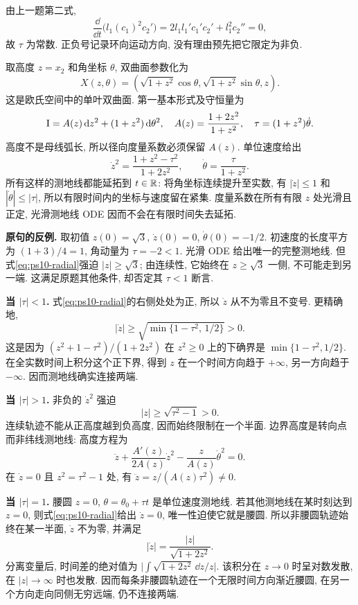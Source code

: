 \begin{solution}
由上一题第二式,
\[
 \frac{\dd}{\dd t}\bigl(l_1(c_1)^2c_2'\bigr)
 =2l_1l_1'c_1'c_2'+l_1^2c_2''=0,
\]
故 $\tau$ 为常数. 正负号记录环向运动方向, 没有理由预先把它限定为非负.

取高度 $z=x_2$ 和角坐标 $\theta$, 双曲面参数化为
\[
 X(z,\theta)=(\sqrt{1+z^2}\cos\theta,\sqrt{1+z^2}\sin\theta,z).
\]
这是欧氏空间中的单叶双曲面. 第一基本形式及守恒量为
\[
 \mathrm{I}=A(z)\,\mathrm d z^2+(1+z^2)\,\mathrm d\theta^2,\quad
 A(z)=\frac{1+2z^2}{1+z^2},\quad
 \tau=(1+z^2)\dot\theta.
\]
高度不是母线弧长, 所以径向度量系数必须保留 $A(z)$. 单位速度给出
\begin{equation}\label{eq:ps10-radial}
 \dot z^2=\frac{1+z^2-\tau^2}{1+2z^2},\qquad
 \dot\theta=\frac{\tau}{1+z^2}.
\end{equation}
所有这样的测地线都能延拓到 $t\in\mathbb R$: 将角坐标连续提升至实数, 有 $|\dot z|\le1$ 和 $|\dot\theta|\le|\tau|$, 所以有限时间内的坐标与速度留在紧集. 度量系数在所有有限 $z$ 处光滑且正定, 光滑测地线 ODE 因而不会在有限时间失去延拓.

\textbf{原句的反例.} 取初值 $z(0)=\sqrt3$, $\dot z(0)=0$, $\dot\theta(0)=-1/2$. 初速度的长度平方为 $(1+3)/4=1$, 角动量为 $\tau=-2<1$. 光滑 ODE 给出唯一的完整测地线. 但式\eqref{eq:ps10-radial}强迫 $|z|\ge\sqrt3$; 由连续性, 它始终在 $z\ge\sqrt3$ 一侧, 不可能走到另一端. 这满足原题其他条件, 却否定其 $\tau<1$ 断言.

\textbf{当 $|\tau|<1$.} 式\eqref{eq:ps10-radial}的右侧处处为正, 所以 $\dot z$ 从不为零且不变号. 更精确地,
\[
 |\dot z|\ge\sqrt{\min\{1-\tau^2,\,1/2\}}>0.
\]
这是因为 $(z^2+1-\tau^2)/(1+2z^2)$ 在 $z^2\ge0$ 上的下确界是 $\min\{1-\tau^2,1/2\}$. 在全实数时间上积分这个正下界, 得到 $z$ 在一个时间方向趋于 $+\infty$, 另一方向趋于 $-\infty$. 因而测地线确实连接两端.

\textbf{当 $|\tau|>1$.} 非负的 $\dot z^2$ 强迫
\[
 |z|\ge\sqrt{\tau^2-1}>0.
\]
连续轨迹不能从正高度越到负高度, 因而始终限制在一个半面. 边界高度是转向点而非纬线测地线: 高度方程为
\[
 \ddot z+\frac{A'(z)}{2A(z)}\dot z^2
 -\frac z{A(z)}\dot\theta^2=0.
\]
在 $\dot z=0$ 且 $z^2=\tau^2-1$ 处, 有 $\ddot z=z/(A(z)\tau^2)\ne0$.

\textbf{当 $|\tau|=1$.} 腰圆 $z=0$, $\theta=\theta_0+\tau t$ 是单位速度测地线. 若其他测地线在某时刻达到 $z=0$, 则式\eqref{eq:ps10-radial}给出 $\dot z=0$, 唯一性迫使它就是腰圆. 所以非腰圆轨迹始终在某一半面, $\dot z$ 不为零, 并满足
\[
 |\dot z|=\frac{|z|}{\sqrt{1+2z^2}}.
\]
分离变量后, 时间差的绝对值为 $\bigl|\int \sqrt{1+2z^2}\,\dd z/z\bigr|$. 该积分在 $z\to0$ 时呈对数发散, 在 $|z|\to\infty$ 时也发散. 因而每条非腰圆轨迹在一个无限时间方向渐近腰圆, 在另一个方向走向同侧无穷远端, 仍不连接两端.
\end{solution}


